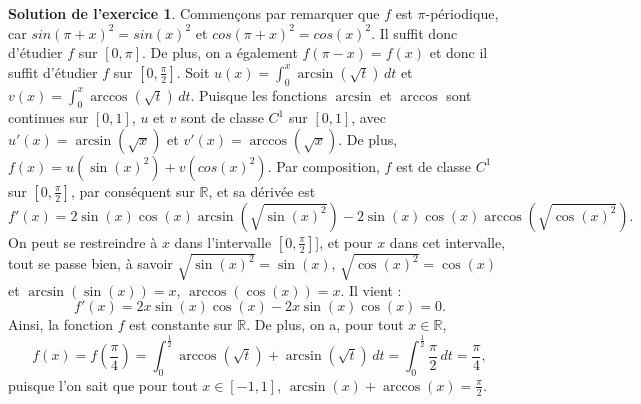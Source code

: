 \documentclass[a4paper, 11pt,openany]{article}%
\theoremstyle{plain}
\theoremstyle{definition}
\newtheorem{sol}{Solution de l'exercice}
\theoremstyle{remark}
\newcommand{\R}{\mathbb{R}}
\begin{document}
\begin{sol}
Commençons par remarquer que $f$ est $\pi$-périodique, car $sin(\pi+x)^2=sin(x)^2$ et $cos(\pi+x)^2=cos(x)^2$. Il suffit donc d'étudier $f$ sur $[0,\pi]$. De plus, on a également $f(\pi-x)=f(x)$ et donc il suffit d'étudier $f$ sur $\left[0, \frac{\pi}{2} \right]$. Soit $u(x)=\int_0^x \arcsin(\sqrt{t}) \,dt$ et $v(x)=\int_0^x \arccos(\sqrt{t}) \,dt$. Puisque les fonctions $\arcsin$ et $\arccos$ sont continues sur $[0,1]$, $u$ et $v$ sont de classe $C^1$ sur $[0,1]$, avec $u'(x)=\arcsin(\sqrt{x})$ et $v'(x)=\arccos(\sqrt{x})$. De plus, $f(x)=u(\sin(x)^2)+v(cos(x)^2)$. Par composition, $f$ est de classe $C^1$ sur $\left[0,\frac{\pi}{2} \right]$, par conséquent sur $\R$, et sa dérivée est 
\[ f'(x)=2\sin(x) \cos(x) \arcsin(\sqrt{\sin(x)^2}) - 2\sin(x) \cos(x) \arccos(\sqrt{\cos(x)^2}).\]
On peut se restreindre à $x$ dans l'intervalle $\left[ 0 ,\frac{\pi}{2} \right]$], et pour $x$ dans cet intervalle, tout se passe bien, à savoir $\sqrt{\sin(x)^2}=\sin(x)$, $\sqrt{\cos(x)^2}=\cos(x)$ et $\arcsin(\sin(x))=x$, $\arccos(\cos(x))=x$. Il vient :
\[ f'(x)=2x\sin(x)\cos(x)-2x\sin(x)\cos(x)=0.\] Ainsi, la fonction $f$ est constante sur $\R$. De plus, on a, pour tout $x \in \R$, 
\[ f(x)=f \left( \frac{\pi}{4} \right) =  \int_0^{\frac{1}{2}} \arccos(\sqrt{t}) + \arcsin(\sqrt{t}) \, dt= \int_0^{\frac{1}{2}} \frac{\pi}{2} \, dt = \frac{\pi}{4},\]
puisque l'on sait que pour tout $x \in [-1,1]$, $\arcsin(x)+\arccos(x)= \frac{\pi}{2}$.
\end{sol}
\end{document}
